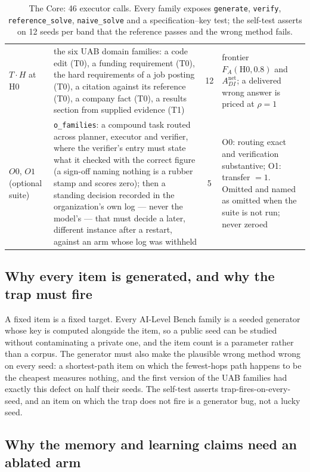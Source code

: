 \documentclass[11pt]{article}
\theoremstyle{definition}
\begin{document}
\begin{table}[!htbp]
\begin{tabularx}{\textwidth}{@{}>{\raggedright\arraybackslash}p{1.9cm}>{\raggedright\arraybackslash}p{7.4cm}cY@{}}
$T \cdot H$ at H0 & the six UAB domain families: a code edit (T0), a funding requirement (T0), the hard requirements of a job posting (T0), a citation against its reference (T0), a company fact (T0), a results section from supplied evidence (T1) & 12 & frontier $F_A(\text{H0}, 0.8)$ and $A^{\text{net}}_{DI}$; a delivered wrong answer is priced at $\rho = 1$ \\
$O0$, $O1$ (optional suite) & \texttt{o\_families}: a compound task routed across planner, executor and verifier, where the verifier's entry must state what it checked with the correct figure (a sign-off naming nothing is a rubber stamp and scores zero); then a standing decision recorded in the organization's own log --- never the model's --- that must decide a later, different instance after a restart, against an arm whose log was withheld & 5 & O0: routing exact and verification substantive; O1: transfer $= 1$. Omitted and named as omitted when the suite is not run; never zeroed \\
\bottomrule
\end{tabularx}
\caption{The Core: 46 executor calls. Every family exposes \texttt{generate}, \texttt{verify}, \texttt{reference\_solve}, \texttt{naive\_solve} and a specification--key test; the self-test asserts on 12 seeds per band that the reference passes and the wrong method fails.}
\label{tab:core}
\end{table}

\subsection{Why every item is generated, and why the trap must fire}

A fixed item is a fixed target. Every AI-Level Bench family is a seeded generator whose key is computed alongside the item, so a public seed can be studied without contaminating a private one, and the item count is a parameter rather than a corpus. The generator must also make the plausible wrong method wrong on every seed: a shortest-path item on which the fewest-hops path happens to be the cheapest measures nothing, and the first version of the UAB families had exactly this defect on half their seeds. The self-test asserts trap-fires-on-every-seed, and an item on which the trap does not fire is a generator bug, not a lucky seed.

\subsection{Why the memory and learning claims need an ablated arm}
\end{document}
